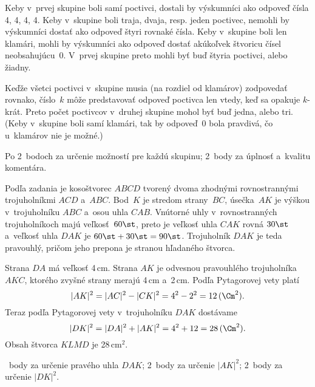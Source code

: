{%
Keby v~prvej skupine boli samí poctivci, dostali by výskumníci ako odpoveď čísla 4, 4, 4, 4.
Keby v~skupine boli traja, dvaja, resp. jeden poctivec, nemohli by výskumníci dostať ako odpoveď štyri rovnaké čísla.
Keby v~skupine boli len klamári, mohli by výskumníci ako odpoveď dostať akúkoľvek štvoricu čísel neobsahujúcu~0.
V~prvej skupine preto mohli byť buď štyria poctivci, alebo žiadny.

Keďže všetci poctivci v~skupine musia (na rozdiel od klamárov) zodpovedať rovnako, číslo~$k$ môže predstavovať odpoveď poctivca len vtedy, keď sa opakuje $k$-krát.
Preto počet poctivcov v~druhej skupine mohol byť buď jedna, alebo tri.
(Keby v~skupine boli samí klamári, tak by odpoveď~0 bola pravdivá, čo u~klamárov nie je možné.)

\hodnotenie
Po 2~bodoch za určenie možností pre každú skupinu;
2~body za úplnosť a~kvalitu komentára.
\endhodnotenie
}

{%
Podľa zadania je kosoštvorec $ABCD$ tvorený dvoma zhodnými rovnostrannými trojuholníkmi $ACD$ a~$ABC$.
Bod~$K$ je stredom strany~$BC$, úsečka~$AK$ je výškou v~trojuholníku $ABC$ a~osou uhla $CAB$.
Vnútorné uhly v~rovnostranných trojuholníkoch majú veľkosť~$60\st$, preto je veľkosť uhla $CAK$ rovná $30\st$ a~veľkosť uhla $DAK$ je $60\st+30\st=90\st$.
Trojuholník $DAK$ je teda pravouhlý, pričom jeho prepona je stranou hľadaného štvorca.

Strana $DA$ má veľkosť 4\,cm.
Strana $AK$ je odvesnou pravouhlého trojuholníka $AKC$, ktorého zvyšné strany merajú 4\,cm a~2\,cm.
Podľa Pytagorovej vety platí
$$
|AK|^2 =|AC|^2-|CK|^2 =4^2-2^2 =12\,(\Cm^2).
$$
Teraz podľa Pytagorovej vety v~trojuholníku $DAK$ dostávame
$$
|DK|^2 =|DA|^2+|AK|^2 =4^2+12 =28\,(\Cm^2).
$$
Obsah štvorca $KLMD$ je 28\,cm$^2$.
%

~body za určenie pravého uhla $DAK$;
2~body za určenie $|AK|^2$;
2~body za určenie $|DK|^2$.
\endhodnotenie
}

